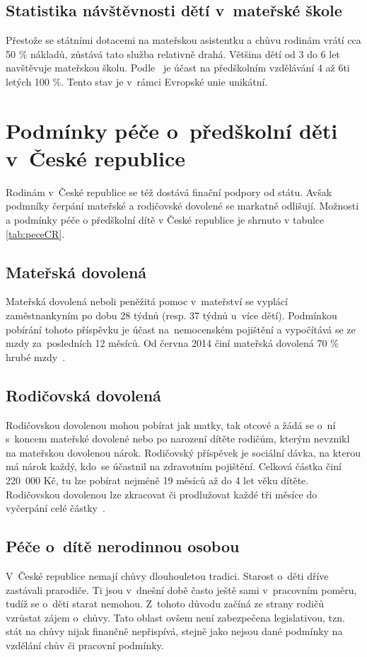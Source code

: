 			\subsection{Statistika návštěvnosti dětí v mateřské škole}
			\label{statistika}
				Přestože se státními dotacemi na mateřskou asistentku a chůvu rodinám vrátí cca 50 \% nákladů, zůstává tato služba relativně drahá. Většina dětí od 3 do 6 let navštěvuje mateřskou školu. Podle~\cite{Eurydice} je účast na předškolním vzdělávání 4 až 6ti letých 100 \%. Tento stav je v~rámci Evropské unie unikátní. 
			

		\section{Podmínky péče o~předškolní děti v~České republice}
		Rodinám v~České republice se též dostává finační podpory od státu. Avšak podmníky čerpání mateřské a rodičovské dovolené se markatně odlišují. Možnosti a podmínky péče o předškolní dítě v České republice je shrnuto v tabulce \ref{tab:peceCR}.

			\subsection{Mateřská dovolená}
				Mateřská dovolená neboli peněžitá pomoc v mateřství se vyplácí zaměstnankyním po dobu 28 týdnů (resp. 37 týdnů u~více dětí). Podmínkou pobírání tohoto příspěvku je účast na nemocenském pojištění a vypočítává se ze mzdy za posledních 12 měsíců. Od června 2014 činí mateřská dovolená 70 \% hrubé mzdy~\citep{materska}.

			\subsection{Rodičovská dovolená}
				Rodičovskou dovolenou mohou pobírat jak matky, tak otcové a žádá se o~ní s koncem mateřské dovolené nebo po narození dítěte rodičům, kterým nevznikl na mateřskou dovolenou nárok. Rodičovský příspěvek je sociální dávka, na kterou má nárok každý, kdo se účastnil na zdravotním pojištění. Celková částka činí 220 000 Kč, tu lze pobírat nejméně 19 měsíců až do 4 let věku dítěte. Rodičovskou dovolenou lze zkracovat či prodlužovat každé tři měsíce do vyčerpání celé částky~\citep{rodicovska}.

			\subsection{Péče o~dítě nerodinnou osobou}
				V~České republice nemají chůvy dlouhouletou tradici. Starost o~děti dříve zastávali prarodiče. Ti jsou v~dnešní době často ještě sami v~pracovním poměru, tudíž se o~děti starat nemohou. Z~tohoto důvodu začíná ze strany rodičů vzrůstat zájem o~chůvy. Tato oblast ovšem není zabezpečena legislativou, tzn. stát na chůvy nijak finančně nepřispívá, stejně jako nejsou dané podmínky na vzdělání chův či pracovní podmínky. 


